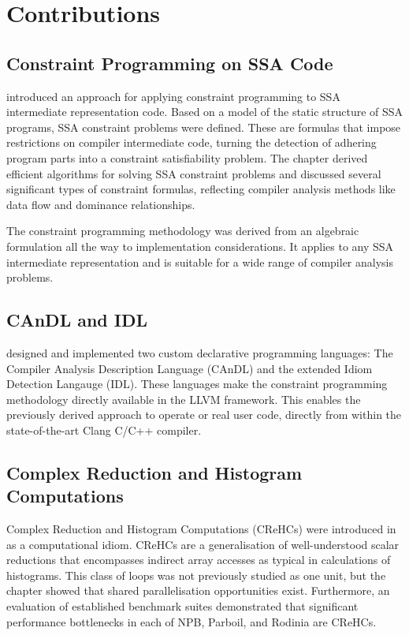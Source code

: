 \section{Contributions}

\subsection*{Constraint Programming on SSA Code}

     introduced an approach for applying constraint
    programming to SSA intermediate representation code.
    Based on a model of the static structure of SSA programs, SSA constraint
    problems were defined.
    These are formulas that impose restrictions on compiler intermediate code,
    turning the detection of adhering program parts into a constraint
    satisfiability problem.
    The chapter derived efficient algorithms for solving SSA constraint problems
    and discussed several significant types of constraint formulas, reflecting
    compiler analysis methods like data flow and dominance relationships.

    The constraint programming methodology was derived from an algebraic
    formulation all the way to implementation considerations.
    It applies to any SSA intermediate representation and is suitable for a
    wide range of compiler analysis problems.

\subsection*{CAnDL and IDL}

     designed and implemented two
    custom declarative programming languages: The Compiler Analysis
    Description Language (CAnDL) and the extended Idiom Detection Langauge
    (IDL).
    These languages make the constraint programming methodology directly
    available in the LLVM framework.
    This enables the previously derived approach to operate or real user code,
    directly from within the state-of-the-art Clang C/C++ compiler.

\subsection*{Complex Reduction and Histogram Computations}

    Complex Reduction and Histogram Computations (CReHCs) were introduced in
     as a computational idiom.
    CReHCs are a generalisation of well-understood scalar reductions that
    encompasses indirect array accesses as typical in calculations of
    histograms.
    This class of loops was not previously studied as one unit, but the
    chapter showed that shared parallelisation opportunities exist.
    Furthermore, an evaluation of established benchmark suites demonstrated
    that significant performance bottlenecks in each of NPB, Parboil, and
    Rodinia are CReHCs.


